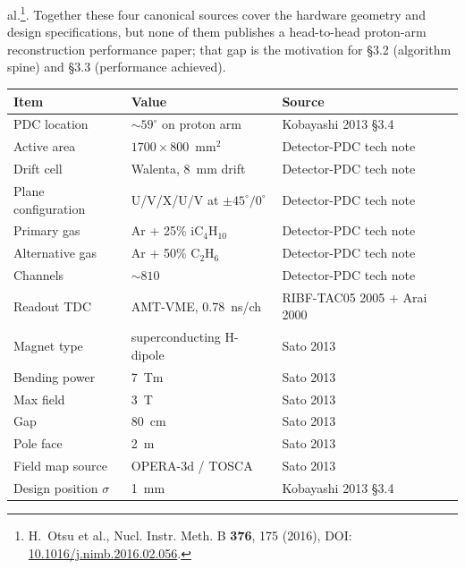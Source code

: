 \documentclass[a4paper, 11pt]{article}
\begin{document}
al.\footnote{\label{fn:otsu2016}H.~Otsu et al., Nucl. Instr. Meth. B \textbf{376}, 175 (2016), DOI: \href{https://doi.org/10.1016/j.nimb.2016.02.056}{10.1016/j.nimb.2016.02.056}.}. Together these four canonical sources cover the hardware geometry and design specifications, but none of them publishes a head-to-head proton-arm reconstruction performance paper; that gap is the motivation for §3.2 (algorithm spine) and §3.3 (performance achieved).

\begin{table}[H]
  \centering
  \small
  \begin{tabular}{p{5.0cm} p{5.0cm} p{4.6cm}}
    \toprule
    Item & Value & Source \\
    \midrule
    PDC location              & $\sim 59^\circ$ on proton arm        & Kobayashi 2013 §3.4 \\
    Active area               & $1700 \times 800$~mm$^2$             & Detector-PDC tech note \\
    Drift cell                & Walenta, 8~mm drift                  & Detector-PDC tech note \\
    Plane configuration       & U/V/X/U/V at $\pm 45^\circ/0^\circ$  & Detector-PDC tech note \\
    Primary gas               & Ar + 25\% iC$_4$H$_{10}$             & Detector-PDC tech note \\
    Alternative gas           & Ar + 50\% C$_2$H$_6$                 & Detector-PDC tech note \\
    Channels                  & $\sim 810$                           & Detector-PDC tech note \\
    Readout TDC               & AMT-VME, 0.78~ns/ch                  & RIBF-TAC05 2005 + Arai 2000 \\
    Magnet type               & superconducting H-dipole             & Sato 2013 \\
    Bending power             & 7~Tm                                 & Sato 2013 \\
    Max field                 & 3~T                                  & Sato 2013 \\
    Gap                       & 80~cm                                & Sato 2013 \\
    Pole face                 & 2~m                                  & Sato 2013 \\
    Field map source          & OPERA-3d / TOSCA                     & Sato 2013 \\
    Design position $\sigma$  & 1~mm                                 & Kobayashi 2013 §3.4 \\

\end{tabular}
\end{table}
\end{document}
